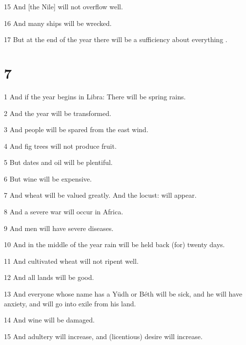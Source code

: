 \par 15 And [the Nile] will not overflow well. 

\par 16 And many ships will be wrecked. 

\par 17 But at the end of the year there will be a sufficiency about everything .

\chapter{7}

\par 1 And if the year begins in Libra: There will be spring rains. 

\par 2 And the year will be transformed. 

\par 3 And people will be spared from the east wind. 

\par 4 And fig trees will not produce fruit.

\par 5 But dates and oil will be plentiful. 

\par 6 But wine will be expensive. 

\par 7 And wheat will be valued greatly. And the locust: will appear. 

\par 8 And a severe war will occur in Africa. 

\par 9 And men will have severe diseases. 

\par 10 And in the middle of the year rain will be held back (for) twenty days. 

\par 11 And cultivated wheat will not ripent well. 

\par 12 And all lands will be good. 

\par 13 And everyone whose name has a Yūdh or Béth will be sick, and he will have anxiety, and will go into exile from his land. 

\par 14 And wine will be damaged. 

\par 15 And adultery will increase, and (licentious) desire will increase. 


